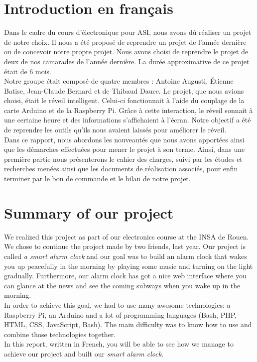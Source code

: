 \section{Introduction en français}
Dans le cadre du cours d'électronique pour ASI, nous avons dû réaliser un projet de notre choix. Il nous a été proposé de reprendre un projet de l'année dernière ou de concevoir notre propre projet. Nous avons choisi de reprendre le projet de deux de nos camarades de l'année dernière. La durée approximative de ce projet était de 6 mois.\\

Notre groupe était composé de quatre membres : Antoine Augusti, Étienne Batise, Jean-Claude Bernard et de Thibaud Dauce. Le projet, que nous avions choisi, était le réveil intelligent. Celui-ci fonctionnait à l'aide du couplage de la carte Arduino et de la Raspberry Pi. Grâce à cette interaction, le réveil sonnait à une certaine heure et  des informations s'affichaient à l'écran. Notre objectif a été de reprendre les outils qu'ils nous avaient laissés pour améliorer le réveil.\\

Dans ce rapport, nous abordons les nouveautés que nous avons apportées ainsi que les démarches effectuées pour mener le projet à son terme. Ainsi, dans une première partie nous présenterons le cahier des charges, suivi par les études et recherches menées ainsi que les documents de réalisation associés, pour enfin terminer par le bon de commande et le bilan de notre projet.

\section{Summary of our project}
We realized this project as part of our electronics course at the INSA de Rouen. We chose to continue the project made by two friends, last year. Our project is called \textit{a smart alarm clock} and our goal was to build an alarm clock that wakes you up peacefully in the morning by playing some music and turning on the light gradually. Furthermore, our alarm clock has got a nice web interface where you can glance at the news and see the coming subways when you wake up in the morning.\\

In order to achieve this goal, we had to use many awesome technologies: a Raspberry Pi, an Arduino and a lot of programming languages (Bash, PHP, HTML, CSS, JavaScript, Bash). The main difficulty was to know how to use and combine those technologies together.\\

In this report, written in French, you will be able to see how we manage to achieve our project and built our \textit{smart	alarm clock}.